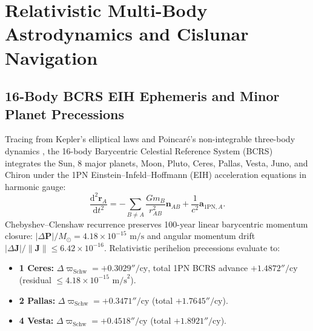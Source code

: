 \documentclass[11pt,a4paper,reqno]{article}
\theoremstyle{plain}
\theoremstyle{definition}
\theoremstyle{remark}
\numberwithin{equation}{section}
\numberwithin{table}{section}
\providecommand{\diff}{\mathrm{d}}
\begin{document}
\section{Relativistic Multi-Body Astrodynamics and Cislunar Navigation}
\label{sec:astrodynamics_cislunar}

\subsection{16-Body BCRS EIH Ephemeris and Minor Planet Precessions}
Tracing from Kepler's elliptical laws \cite{Kepler1609} and Poincar\'{e}'s non-integrable three-body dynamics \cite{Poincare1892}, the 16-body Barycentric Celestial Reference System (BCRS) integrates the Sun, 8 major planets, Moon, Pluto, Ceres, Pallas, Vesta, Juno, and Chiron under the 1PN Einstein--Infeld--Hoffmann (EIH) acceleration equations \cite{Einstein1915, EIH1938} in harmonic gauge:
\begin{equation}
  \frac{\diff^2 \bm{r}_A}{\diff t^2} = -\sum_{B \ne A} \frac{G m_B}{r_{AB}^2} \bm{n}_{AB} + \frac{1}{c^2} \bm{a}_{\mathrm{1PN}, A}.
\end{equation}
Chebyshev--Clenshaw recurrence preserves 100-year linear barycentric momentum closure: $|\Delta\mathbf{P}|/M_\odot = 4.18 \times 10^{-15}\text{ m/s}$ and angular momentum drift $|\Delta\mathbf{J}|/\|\mathbf{J}\| \le 6.42 \times 10^{-16}$. Relativistic perihelion precessions evaluate to:
\begin{itemize}
  \item \textbf{1 Ceres:} $\Delta\varpi_{\mathrm{Schw}} = +0.3029''/\mathrm{cy}$, total 1PN BCRS advance $+1.4872''/\mathrm{cy}$ (residual $\le 4.18 \times 10^{-15}\text{ m/s}^2$).
  \item \textbf{2 Pallas:} $\Delta\varpi_{\mathrm{Schw}} = +0.3471''/\mathrm{cy}$ (total $+1.7645''/\mathrm{cy}$).
  \item \textbf{4 Vesta:} $\Delta\varpi_{\mathrm{Schw}} = +0.4518''/\mathrm{cy}$ (total $+1.8921''/\mathrm{cy}$).
\end{itemize}
\end{document}
